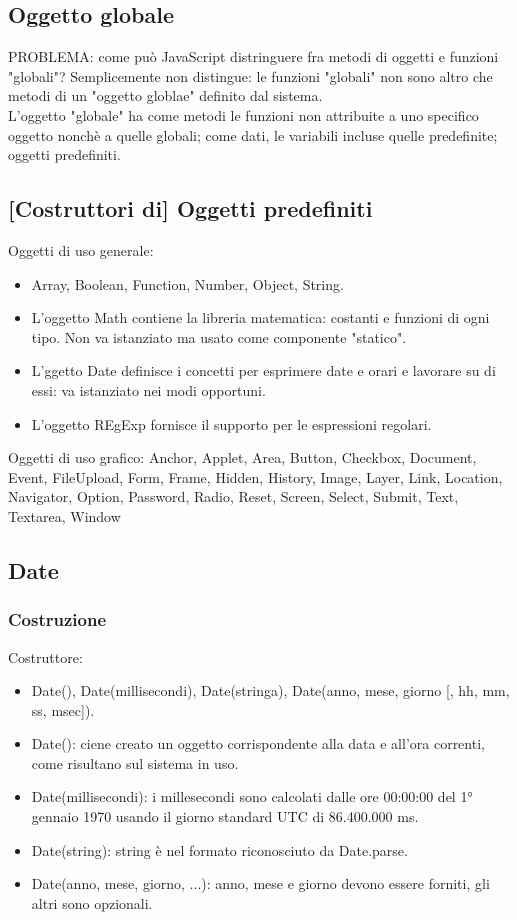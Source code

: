 \documentclass{article}
\begin{document}
\subsection{Oggetto globale}
PROBLEMA: come può JavaScript distringuere fra metodi di oggetti e funzioni "globali"? Semplicemente non distingue: le funzioni "globali" non sono altro che metodi di un "oggetto globlae" definito dal sistema.
\\ L'oggetto "globale" ha come metodi le funzioni non attribuite a uno specifico oggetto nonchè a quelle globali; come dati, le variabili incluse quelle predefinite; oggetti predefiniti.
\subsection{[Costruttori di] Oggetti predefiniti}
Oggetti di uso generale:
\begin{itemize}
    \item Array, Boolean, Function, Number, Object, String.
    \item L'oggetto Math contiene la libreria matematica: costanti e funzioni di ogni tipo. Non va istanziato ma usato come componente "statico".
    \item L'ggetto Date definisce i concetti per esprimere date e orari e lavorare su di essi: va istanziato nei modi opportuni.
    \item L'oggetto REgExp fornisce il supporto per le espressioni regolari.
\end{itemize}
Oggetti di uso grafico: Anchor, Applet, Area, Button, Checkbox, Document, Event,
FileUpload, Form, Frame, Hidden, History, Image, Layer, Link,
Location, Navigator, Option, Password, Radio, Reset, Screen, Select,
Submit, Text, Textarea, Window
\subsection{Date}
\subsubsection{Costruzione}
Costruttore:
\begin{itemize}
    \item Date(), Date(millisecondi), Date(stringa), Date(anno, mese, giorno [, hh, mm, ss, msec]).
    \item Date(): ciene creato un oggetto corrispondente alla data e all'ora correnti, come risultano sul sistema in uso.
    \item Date(millisecondi): i millesecondi sono calcolati dalle ore 00:00:00 del 1° gennaio 1970 usando il giorno standard UTC di 86.400.000 ms.
    \item Date(string): string è nel formato riconosciuto da Date.parse.
    \item Date(anno, mese, giorno, ...): anno, mese e giorno devono essere forniti, gli altri sono opzionali.
\end{itemize}
\end{document}
